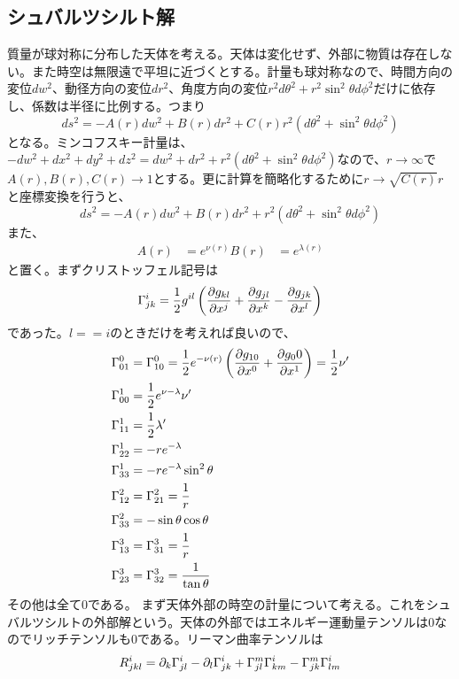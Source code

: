\documentclass{jsarticle}
\begin{document}
        \subsection{シュバルツシルト解}
        	質量が球対称に分布した天体を考える。天体は変化せず、外部に物質は存在しない。また時空は無限遠で平坦に近づくとする。計量も球対称なので、時間方向の変位$dw^2$、動径方向の変位$dr^2$、角度方向の変位$r^2d\theta^2 + r^2\sin^2\theta d\phi^2$だけに依存し、係数は半径に比例する。つまり
        		\[ds^2 = - A(r)dw^2 + B(r)dr^2 + C(r)r^2(d\theta^2 + \sin^2\theta d\phi^2)\]
        	となる。ミンコフスキー計量は、$- dw^2 + dx^2 + dy^2 + dz^2 = dw^2 + dr^2 + r^2(d\theta^2 + \sin^2\theta d\phi^2)$なので、$r \rightarrow \infty$で$A(r),B(r),C(r) \rightarrow 1$とする。更に計算を簡略化するために$r \rightarrow \sqrt{C(r)}r$と座標変換を行うと、
        		\[ds^2 = - A(r)dw^2 + B(r)dr^2 + r^2(d\theta^2 + \sin^2\theta d\phi^2)\]
        	また、
        	\begin{align*}
        		A(r) &= e^{\nu(r)}
        		B(r) &= e^{\lambda(r)}
        	\end{align*}
        	と置く。まずクリストッフェル記号は
        		\[\chr{i}{jk} = \rec{2}g^{il}\lr{\pd[g_{kl}]{x^j} + \pd[g_{jl}]{x^k} - \pd[g_{jk}]{x^l}}\]
        	であった。$l == i$のときだけを考えれば良いので、
        	\begin{align*}
        		\chr{0}{01} &= \chr{0}{10} = \rec{2}e^{-\nu(r)}\lr{\pd[g_{10}]{x^0} + \pd[g_00]{x^1}} = \rec{2}\nu'\\
        		\chr{1}{00} &= \rec{2}e^{\nu - \lambda}\nu'\\
        		\chr{1}{11} &= \rec{2}\lambda'\\
        		\chr{1}{22} &= -re^{-\lambda}\\
        		\chr{1}{33} &= -re^{-\lambda}\sin^2\theta\\
        		\chr{2}{12} &= \chr{2}{21} = \rec{r}\\
        		\chr{2}{33} &= -\sin\theta\cos\theta\\
        		\chr{3}{13} &= \chr{3}{31} = \rec{r}\\
        		\chr{3}{23} &= \chr{3}{32} = \rec{\tan\theta}
        	\end{align*}
        	その他は全て0である。
        	まず天体外部の時空の計量について考える。これをシュバルツシルトの外部解という。天体の外部ではエネルギー運動量テンソルは0なのでリッチテンソルも0である。リーマン曲率テンソルは
        		\[\ricci{i}{jkl} = \pa_k\Ga^i_{jl} - \pa_l\Ga^i_{jk} + \Ga^m_{jl}\Ga^i_{km} - \Ga^m_{jk}\Ga^i_{lm}\]
\end{document}
